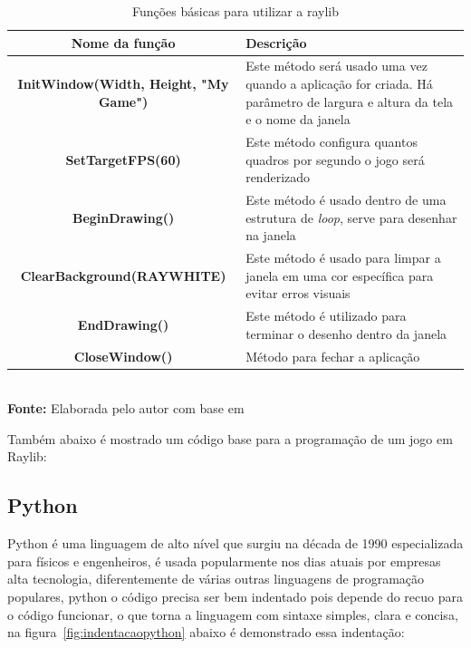 \FloatBarrier
\begin{table}[!htbp]
	\centering
	\caption{Funções básicas para utilizar a raylib}
	\begin{tabular}{ c | p{6cm} }
		\hline
			\textbf{Nome da função} & \textbf{Descrição} \\ \hline
			\textbf{ InitWindow(Width, Height, "My Game")} & Este método será usado uma vez quando a aplicação for criada. Há parâmetro de largura e altura da tela e o nome da janela  \\ \hline
			\textbf{ SetTargetFPS(60)} & Este método configura quantos quadros por segundo o jogo será renderizado \\ \hline
			\textbf{ BeginDrawing()} & Este método é usado dentro de uma estrutura de \textit{loop}, serve para desenhar na janela \\ \hline
			\textbf{ ClearBackground(RAYWHITE)} & Este método é usado para limpar a janela em uma cor específica para evitar erros visuais \\ \hline
			\textbf{ EndDrawing()} & Este método é utilizado para terminar o desenho dentro da janela \\ \hline
			\textbf{ CloseWindow()} & Método para fechar a aplicação \\ \hline
	\end{tabular}
	\\ \vspace{0.2cm}
	\textbf{Fonte:} Elaborada pelo autor com base em \cite{raylib2025}
	\label{funcoesraylib}
\end{table}
\FloatBarrier

Também abaixo é mostrado um código base para a programação de um jogo em Raylib:

 

\subsection{Python}

Python é uma linguagem de alto nível que surgiu na década de 1990 especializada para físicos e engenheiros, é usada popularmente nos dias atuais por empresas alta tecnologia, 
diferentemente de várias outras linguagens de programação populares, python o código precisa ser bem indentado pois depende do recuo para 
o código funcionar, o que torna a linguagem com sintaxe simples, clara e concisa\cite{thinkPython, oracle2025_python}, na figura~\ref{fig:indentacaopython} abaixo é demonstrado essa indentação:

